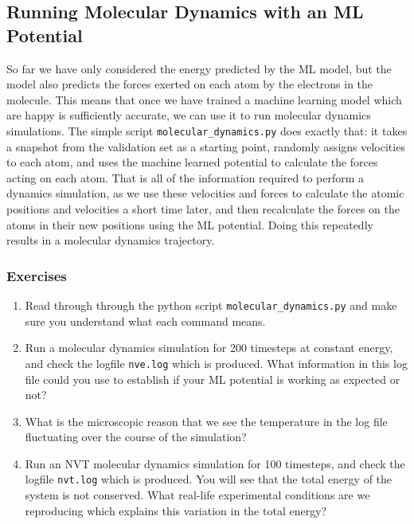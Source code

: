 \documentclass{article}
\begin{document}
\subsection{Running Molecular Dynamics with an ML Potential}
\label{sec:md}


So far we have only considered the energy predicted by the ML model, but the model also predicts the forces exerted on each atom by the electrons in the molecule. This means that once we have trained a machine learning model which are happy is sufficiently accurate, we can use it to run molecular dynamics simulations. The simple script \verb|molecular_dynamics.py| does exactly that: it takes a snapshot from the validation set as a starting point, randomly assigns velocities to each atom, and uses the machine learned potential to calculate the forces acting on each atom. That is all of the information required to perform a dynamics simulation, as we use these velocities and forces to calculate the atomic positions and velocities a short time later, and then recalculate the forces on the atoms in their new positions using the ML potential. Doing this repeatedly results in a molecular dynamics trajectory.

\subsubsection*{Exercises}

\begin{enumerate}

\item Read through through the python script \verb|molecular_dynamics.py| and make sure you understand what each command means.
\item Run a molecular dynamics simulation for 200 timesteps at constant energy, and check the logfile \verb|nve.log| which is produced. What information in this log file could you use to establish if your ML potential is working as expected or not?
\item What is the microscopic reason that we see the temperature in the log file fluctuating over the course of the simulation?
\item Run an NVT molecular dynamics simulation for 100 timesteps, and check the logfile \verb|nvt.log| which is produced. You will see that the total energy of the system is not conserved. What real-life experimental conditions are we reproducing which explains this variation in the total energy?

\end{enumerate}
\end{document}
